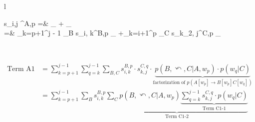 \documentclass[11pt,a4paper]{article}
\begin{document}
\begin{table*}[!ht]
	\centering
	{\setlength{\tabcolsep}{.0em}
		\begin{tabular}{l}
			\toprule 
			\begin{minipage}{\linewidth}
				\vspace{-.5em}\small
				{\begin{flalign}
					\label{eq:inside_naive}
						\!\!\!\!\!\!\!s_{i,j} ^{A,p} 	=& _{} +  _{\text{Term A2}} \\
					\label{eq:inside_eisner}
					=& \sum_{k=p+1}^{j - 1} \sum_{B} s_{i, k}^{B,p}  _{} +\sum_{k=i+1}^{p}  \sum_{C}   s_{k_2, j}^{C,p} _{\text{Term B2}}
					\end{flalign}}
				\vspace{-.5em}
			\end{minipage}\\
			\toprule 
			\begin{minipage}{\linewidth}
				\vspace{-.5em}\small
				{\begin{align}
					\label{eq:inside_zhu_factor}
					\text{Term A1}  &= \sum_{k=p+1}^{j - 1}\sum_{q=k}^{j - 1}\sum_{B, C}   s_{i, k}^{B,p} \cdot s_{k, j}^{C,q} \cdot \underbrace{p(B, \curvearrowleft, C | A,w_p) \cdot  p(w_{q}| C )}_{\text{factorization of } p(A[w_{p}] \rightarrow B[w_{p}] C[w_{q}])} \\
					\label{eq:inside_zhu}
					&= \sum_{k=p+1}^{j - 1}\sum_{B}  s_{i, k}^{B, p} \underbrace{\sum_{C} p(B, \curvearrowleft, C | A,w_p)   \underbrace{ \sum_{q = k}^{j - 1}  s_{k, j}^{C,q} \cdot  p(w_{q}| C )}_{\text{Term C1-1}}}_{\text{Term C1-2}} 
					\end{align}}
				\vspace{-.5em}
			\end{minipage}\\
			\toprule
			\begin{minipage}{\linewidth}
				\vspace{-.5em}\small
				{\begin{align}

\end{align}}
\end{minipage}
\end{tabular}}
\end{table*}
\end{document}
